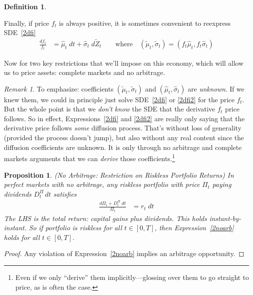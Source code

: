 \documentclass[12pt]{article}
\theoremstyle{plain}
\newtheorem{prop}[thm]{Proposition}
\theoremstyle{definition}
\newtheorem{defn}[thm]{Definition}
\theoremstyle{remark}
\newtheorem*{rmk}{Remark}
\begin{document}
\begin{defn}
\begin{itemize}
    Finally, if price $f_t$ is always positive, it is sometimes
    convenient to reexpress SDE~\ref{2dfi}
    \begin{align}
      \frac{df_{t}}{f_t}
      &=
      \hat{\mu}_t
      \; dt
      +
      \hat{\sigma}_t
      \;d\tilde{Z}_t
      \qquad \text{where}\quad
      (\tilde{\mu}_t,\tilde{\sigma}_t)=(f_t\hat{\mu}_t,f_t\hat{\sigma}_t)
      \label{2dfi2}
    \end{align}
\end{itemize}
Now for two key restrictions that we'll impose on this economy, which
will allow us to price assets: complete markets and no arbitrage.
\end{defn}
\clearpage
\begin{rmk}
To emphasize: coefficients $(\tilde{\mu}_t,\tilde{\sigma}_t)$ and
$(\hat{\mu}_t,\hat{\sigma}_t)$ are \emph{unknown}.
If we knew them, we could in principle just solve SDE~\ref{2dfi} or
\ref{2dfi2} for the price $f_t$. But the whole point is that we
\emph{don't know} the SDE that the derivative $f_t$ price follows.
So in effect, Expressions~\ref{2dfi} and \ref{2dfi2} are really only
saying that the derivative price follows \emph{some} diffusion process.
That's without loss of generality (provided the process doesn't jump),
but also without any real content since the diffusion coefficients are
unknown.
It is only through no arbitrage and complete markets arguments that we
can \emph{derive} those coefficients.\footnote{%
  Even if we only ``derive'' them implicitly---glossing over them to go
  straight to price, as is often the case.
}
\end{rmk}

\begin{prop}
\emph{(No Arbitrage: Restriction on Riskless Portfolio Returns)}
\label{2prop:keypricing}
In perfect markets with no arbitrage, any riskless portfolio with price
$\Pi_t$ paying dividends $D_t^\Pi\,dt$ satisfies
\begin{align}
  \frac{d\Pi_t+ D_t^\Pi\;dt}{\Pi_t}
  &=
  r_t\;dt
  \label{2noarb}
\end{align}
The LHS is the total return: capital gains plus dividends.
This holds instant-by-instant. So if portfolio is riskless for all
$t\in[0,T]$, then Expression~\ref{2noarb} holds for all $t\in[0,T]$.
\end{prop}
\begin{proof}
Any violation of Expression~\ref{2noarb} implies an arbitrage
opportunity.
\end{proof}
\end{document}

